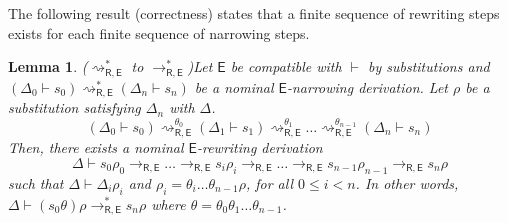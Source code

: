 \documentclass[11pt,a4paper]{amsart}
\newcommand{\theory}[1]{\ensuremath{\mathsf{#1}}}
\theoremstyle{plain}
\newtheorem{lemma}[theorem]{Lemma}
\theoremstyle{definition}
\theoremstyle{remark}
\begin{document}
The following result (correctness) states that a finite sequence of rewriting steps exists for each finite sequence of narrowing steps.


\begin{lemma}{($\rightsquigarrow_{\theory{R,E}}^*$ to $\to_{\theory{R,E}}^*$)}\label{theo:narrowtorewrite}
Let \theory{E} be compatible with $\vdash$ by substitutions and  $(\Delta_0\vdash s_0) \rightsquigarrow^*_{\theory{R,E}} (\Delta_n \vdash s_n) $ be a nominal \theory{E}-narrowing derivation. 
Let $\rho$ be a substitution satisfying $\Delta_n$ with  $\Delta$.
$$(\Delta_0\vdash s_0) \rightsquigarrow^{\theta_0}_{\theory{R,E}} (\Delta_1 \vdash s_1) \rightsquigarrow^{\theta_1}_{\theory{R,E}}  \ldots \rightsquigarrow^{\theta_{n-1}}_{\theory{R,E}} (\Delta_n \vdash s_n) $$
Then, there exists a nominal \theory{E}-rewriting derivation 
$$\Delta\vdash s_0\rho_0  \rightarrow_{\theory{R,E}} \ldots \rightarrow_{\theory{R,E}} s_i\rho_i \rightarrow_{\theory{R,E}}\ldots   \rightarrow_{\theory{R,E}} s_{n-1}\rho_{n-1}\rightarrow_{\theory{R,E}} s_n\rho$$ 
such that $\Delta\vdash \Delta_i\rho_{i}$ and $\rho_{i}=\theta_{i}\ldots \theta_{n-1}\rho$, for all $0\leq i < n$. In other words,
$\Delta\vdash (s_0 \theta )\rho \rightarrow^*_{\theory{R,E}}  s_n \rho $
where $\theta=\theta_0\theta_1\ldots \theta_{n-1}$.
\end{lemma}
\end{document}
